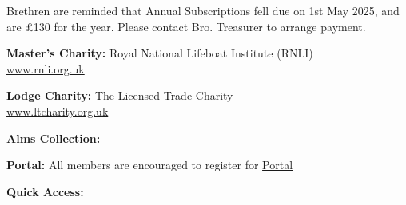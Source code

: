 
\noindent Brethren are reminded that Annual Subscriptions fell due on 1st May 2025, and are £130 for the year. Please contact Bro. Treasurer to arrange payment.

\vspace{\baselineskip}

\vspace{0.5\baselineskip}

\noindent
\begin{minipage}[t]{0.65\textwidth}
\small
\textbf{Master's Charity:} Royal National Lifeboat Institute (RNLI)\\
\href{https://www.rnli.org.uk}{www.rnli.org.uk}

\vspace{0.3\baselineskip}

\textbf{Lodge Charity:} The Licensed Trade Charity\\
\href{https://www.ltcharity.org.uk}{www.ltcharity.org.uk}
\end{minipage}\hfill
\begin{minipage}[t]{0.30\textwidth}
\raggedleft
\textbf{Alms Collection:}\\
\vspace{0.2\baselineskip}
\end{minipage}

\vspace{\baselineskip}


\noindent
\begin{minipage}[t]{0.65\textwidth}
\vspace{0.3\baselineskip}

\textbf{Portal:} All members are encouraged to register for \href{https://mobile.portal.ugle.org.uk/auth/register}{Portal}
\end{minipage}\hfill
\begin{minipage}[t]{0.30\textwidth}
\raggedleft
\textbf{Quick Access:}\\
\vspace{0.2\baselineskip}
\end{minipage}